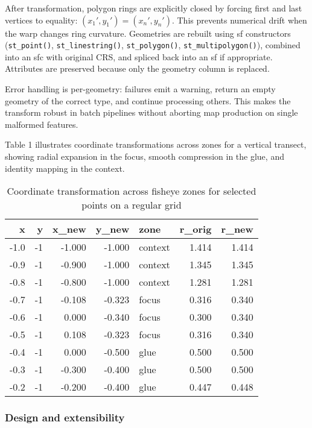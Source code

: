 After transformation, polygon rings are explicitly closed by forcing first and last vertices to equality: \((x_1', y_1') = (x_n', y_n')\). This prevents numerical drift when the warp changes ring curvature. Geometries are rebuilt using sf constructors (\texttt{st\_point()}, \texttt{st\_linestring()}, \texttt{st\_polygon()}, \texttt{st\_multipolygon()}), combined into an sfc with original CRS, and spliced back into an sf if appropriate. Attributes are preserved because only the geometry column is replaced.

Error handling is per-geometry: failures emit a warning, return an empty geometry of the correct type, and continue processing others. This makes the transform robust in batch pipelines without aborting map production on single malformed features.

Table 1 illustrates coordinate transformations across zones for a vertical transect, showing radial expansion in the focus, smooth compression in the glue, and identity mapping in the context.

\begin{table}

\caption{\label{tab:transformation-table}Coordinate transformation across fisheye zones for selected points on a regular grid}
\centering
\begin{tabular}[t]{r|r|r|r|l|r|r}
\hline
x & y & x\_new & y\_new & zone & r\_orig & r\_new\\
\hline
-1.0 & -1 & -1.000 & -1.000 & context & 1.414 & 1.414\\
\hline
-0.9 & -1 & -0.900 & -1.000 & context & 1.345 & 1.345\\
\hline
-0.8 & -1 & -0.800 & -1.000 & context & 1.281 & 1.281\\
\hline
-0.7 & -1 & -0.108 & -0.323 & focus & 0.316 & 0.340\\
\hline
-0.6 & -1 & 0.000 & -0.340 & focus & 0.300 & 0.340\\
\hline
-0.5 & -1 & 0.108 & -0.323 & focus & 0.316 & 0.340\\
\hline
-0.4 & -1 & 0.000 & -0.500 & glue & 0.500 & 0.500\\
\hline
-0.3 & -1 & -0.300 & -0.400 & glue & 0.500 & 0.500\\
\hline
-0.2 & -1 & -0.200 & -0.400 & glue & 0.447 & 0.448\\
\hline
\end{tabular}
\end{table}

\subsubsection{Design and extensibility}\label{design-and-extensibility}

